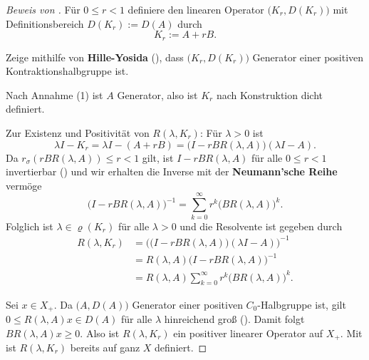 \newpage
\begin{proof}[Beweis von ]
\par
Für $0\leq r < 1$ definiere den linearen Operator $\big(K_r, D(K_r)\big)$ mit Definitionsbereich $D(K_r):=D(A)$ durch
\begin{equation*}
K_r:= A+rB.
\end{equation*}

Zeige mithilfe von \textbf{Hille-Yosida} (), dass $\big(K_r, D(K_r)\big)$ Generator einer positiven Kontraktionshalbgruppe ist.
\par 
Nach Annahme (1) ist $A$ Generator, also ist $K_r$ nach Konstruktion dicht definiert. 

\par 
Zur Existenz und Positivität von $R(\lambda, K_r)$: Für $\lambda>0$ ist
\begin{equation*}
\lambda I - K_r = \lambda I- (A+rB)=\big(I-rBR(\lambda, A)\big)(\lambda I-A).
\end{equation*}
Da $r_\sigma(rBR(\lambda, A))\leq r< 1$ gilt, ist $I-rBR(\lambda, A)$ für alle $0\leq r < 1$ invertierbar () und wir erhalten die  Inverse mit der \textbf{Neumann'sche Reihe} vermöge
\begin{equation*}
\big(I-rBR(\lambda, A)\big)^{-1}=\sum_{k=0}^\infty r^k \big(BR(\lambda, A)\big)^k.
\end{equation*}
Folglich ist $\lambda\in\varrho(K_r)$ für alle $\lambda>0$ und die Resolvente ist gegeben durch
\begin{align*}
R(\lambda, K_r)
&=\Big(\big(I-rBR(\lambda, A)\big)(\lambda I-A)\Big)^{-1}\\
&=R(\lambda, A)\big(I-rBR(\lambda, A)\big)^{-1}\\
&=R(\lambda, A)\sum_{k=0}^\infty r^k \big(BR(\lambda, A)\big)^k.
\end{align*}
\par 
Sei $x\in X_+$. Da $\big(A, D(A)\big)$ Generator einer positiven $C_0$-Halbgruppe ist, gilt $0\leq R(\lambda, A)x\in D(A)$ für alle $\lambda$ hinreichend groß (). Damit folgt $BR(\lambda,A)x\geq0$. Also ist  $R(\lambda, K_r)$ ein positiver linearer Operator auf $X_+$. Mit  ist $R(\lambda, K_r)$ bereits auf ganz $X$ definiert.


\end{proof}
